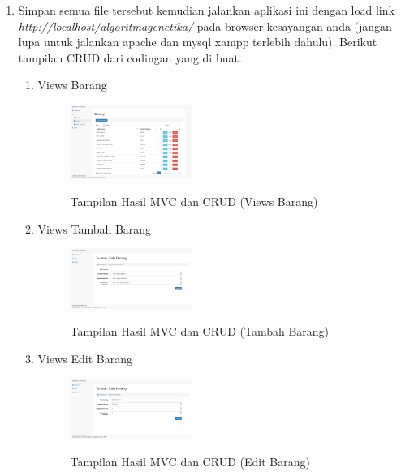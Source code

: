 \begin{enumerate}
\begin{enumerate}
    	\item Simpan semua file tersebut kemudian jalankan aplikasi ini dengan load link \textit{http://localhost/algoritmagenetika/} pada browser kesayangan anda (jangan lupa untuk jalankan apache dan mysql xampp terlebih dahulu). Berikut tampilan CRUD dari codingan yang di buat.
    	\begin{enumerate}
    	    \item Views Barang
    		\begin{figure}[!htbp]
        		\centering
        		\caption{Tampilan Hasil MVC dan CRUD (Views Barang)}
        		\includegraphics[width=0.4\textwidth]{figures/Views5.png}
        		\label{Views5}
    		\end{figure}
    		
    		\item Views Tambah Barang
    		\begin{figure}[!htbp]
        		\centering
        		\caption{Tampilan Hasil MVC dan CRUD (Tambah Barang)}
        		\includegraphics[width=0.4\textwidth]{figures/Views6.png}
        		\label{Views6}
    		\end{figure}
    		
    		\item Views Edit Barang
    		\begin{figure}[!htbp]
        		\centering
        		\caption{Tampilan Hasil MVC dan CRUD (Edit Barang)}
        		\includegraphics[width=0.4\textwidth]{figures/Views7.png}
        		\label{Views7}
    		\end{figure}
    	\end{enumerate}
    \end{enumerate}
\end{enumerate}